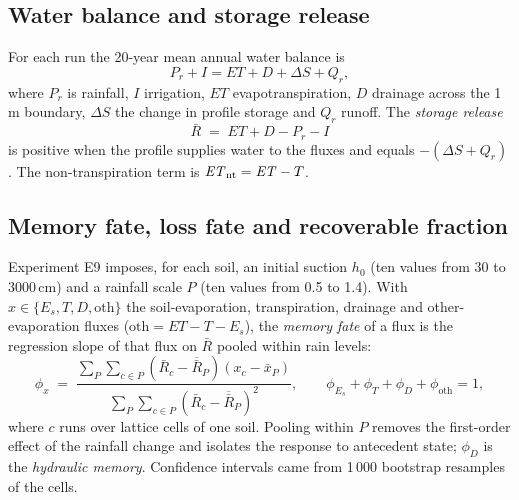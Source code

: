 \documentclass[review,12pt,authoryear]{elsarticle}
\begin{document}

\subsection{Water balance and storage release}
For each run the 20-year mean annual water balance is
\begin{equation}
P_r + I = \mathit{ET} + D + \Delta S + Q_r,
\label{eq:wb}
\end{equation}
where $P_r$ is rainfall, $I$ irrigation, $\mathit{ET}$ evapotranspiration, $D$ drainage across the 1\,m boundary, $\Delta S$ the change in profile storage and $Q_r$ runoff. The \emph{storage release}
\begin{equation}
\bar R \;=\; \mathit{ET}+D-P_r-I
\label{eq:release}
\end{equation}
is positive when the profile supplies water to the fluxes and equals $-(\Delta S+Q_r)$. The non-transpiration term is $\mathit{ET}_{\mathrm{nt}}=\mathit{ET}-T$.

\subsection{Memory fate, loss fate and recoverable fraction}
Experiment E9 imposes, for each soil, an initial suction $h_0$ (ten values from 30 to 3000\,cm) and a rainfall scale $P$ (ten values from 0.5 to 1.4). With $x\in\{E_s,T,D,\text{oth}\}$ the soil-evaporation, transpiration, drainage and other-evaporation fluxes ($\text{oth}=\mathit{ET}-T-E_s$), the \emph{memory fate} of a flux is the regression slope of that flux on $\bar R$ pooled within rain levels:
\begin{equation}
\phi_x \;=\; \frac{\sum_{P}\sum_{c\in P}(\bar R_c-\overline{\bar R}_P)(x_c-\bar x_P)}{\sum_{P}\sum_{c\in P}(\bar R_c-\overline{\bar R}_P)^2},\qquad \phi_{E_s}+\phi_T+\phi_D+\phi_{\mathrm{oth}}=1 ,
\label{eq:phi}
\end{equation}
where $c$ runs over lattice cells of one soil. Pooling within $P$ removes the first-order effect of the rainfall change and isolates the response to antecedent state; $\phi_D$ is the \emph{hydraulic memory}. Confidence intervals came from 1\,000 bootstrap resamples of the cells.
\end{document}
